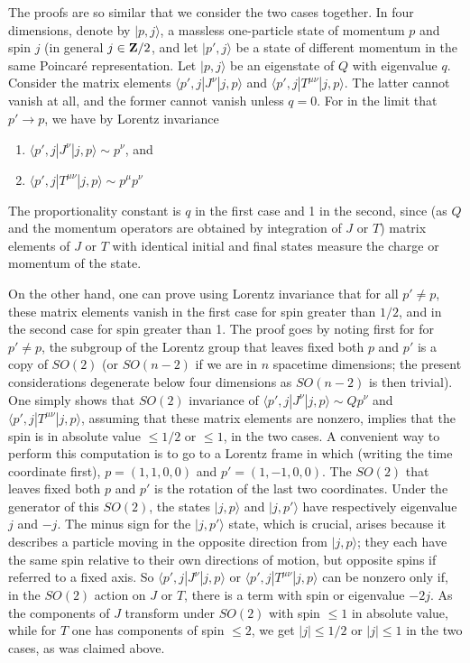 The proofs are so similar that we consider the two cases together.  
In four dimensions, 
denote by $|p,j\rangle$, a massless one-particle
state of momentum $p$ and spin $j$
(in general $j\in {\bf Z}/2$, and let $|p',j\rangle$ be a state of different
momentum in the same Poincar\'e representation.
 Let $|p,j\rangle$  be an eigenstate of $Q$ with
eigenvalue $q$.   Consider the matrix elements
$\langle p',j|J^\nu|j,p\rangle $ and
$\langle p',j|T^{\mu\nu}|j,p\rangle$.  The latter cannot vanish
at all, and the former cannot vanish unless $q=0$.
For  in the limit that $p'\to p$,
 we have by Lorentz invariance
\begin{enumerate}
\item $\langle p',j|J^\nu|j,p\rangle \sim  p^\nu$, and

\item $\langle p',j|T^{\mu\nu}|j,p\rangle \sim p^\mu p^\nu$
\end{enumerate}
The  proportionality constant is $q$ in the first case and 1 in the second, 
since
(as $Q$ and the momentum operators are obtained by integration of
$J$ or $T$) matrix elements of $J$ or $T$ with identical initial
and final states measure the charge or momentum of the state.


On the other hand, one can prove using Lorentz invariance that for all
$p'\not= p$, these matrix elements vanish in the first case for spin greater
than $1/2$, and in the second case for spin greater than 1.
The proof goes by noting first for for $p'\not= p$, the subgroup
of the Lorentz group that leaves fixed both $p$ and $p'$ is a copy
of $SO(2)$ (or $SO(n-2)$ if we are in $n$ spacetime dimensions;
the present considerations degenerate below four dimensions as $SO(n-2)$
is then trivial).  One simply shows that  $SO(2)$ invariance of 
$\langle p',j|J^\nu|j,p\rangle \sim Q p^\nu$ and 
 $\langle p',j|T^{\mu\nu}|j,p\rangle$,
  assuming that these matrix elements are nonzero, implies that 
  the spin is in absolute value $\leq 1/2$ or $\leq 1$, in the two cases.
 A convenient way to perform this computation is to go to a Lorentz
 frame in which (writing the time coordinate first), $p=(1,1,0,0)$
 and $p'=(1,-1,0,0)$.  The $SO(2)$ that leaves fixed both $p$ and $p'$
 is the rotation of the last two coordinates.  Under the generator
 of this $SO(2)$, the states $|j,p\rangle$ and $|j,p'\rangle$ have
 respectively eigenvalue $j$ and $-j$.  The minus sign for the $|j,p'\rangle$
 state,
 which is crucial, arises because it describes a particle
  moving in the opposite direction
 from $|j,p\rangle$; they each have the same spin relative to their
 own directions of motion, but opposite spins if referred to a fixed axis.
 So $\langle p',j|J^\nu|j,p\rangle $ or 
 $\langle p',j|T^{\mu\nu}|j,p\rangle$
 can be nonzero only if, in the $SO(2)$ action on $J$ or $T$, there is
 a term with spin or eigenvalue $-2j$.  As the components of $J$
 transform under $SO(2)$ with
  spin $\leq 1$ in absolute value, while for $T$
 one has components of spin $\leq 2$, we get $|j|\leq 1/2$ or
 $|j|\leq 1$ in the two cases, as was claimed above.

